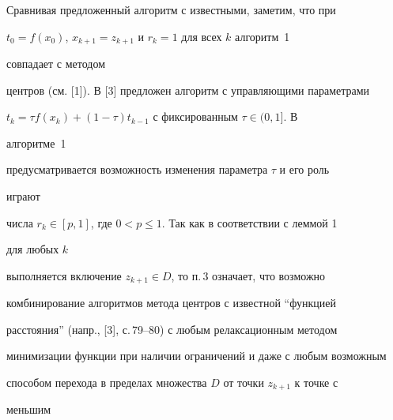 

 


Сравнивая предложенный алгоритм с известными, заметим, что при 


$t_0=f(x_0)$, $x_{k+1}=z_{k+1}$ и $r_k=1$ для всех $k$ алгоритм~1 


совпадает с методом 


центров (см. [1]). В [3] предложен алгоритм с управляющими параметрами 


$t_k=\tau f(x_k)+(1-\tau)t_{k-1}$ с фиксированным $\tau\in(0,1]$. В 


алгоритме~1 


предусматривается возможность изменения параметра $\tau$ и его роль 


играют 


числа $r_k\in[p,1]$, где $0<p\le 1$. Так как в соответствии с леммой 1 


для любых $k$ 


выполняется включение $z_{k+1}\in D$, то п.\,3 означает, что возможно 


комбинирование алгоритмов метода центров с известной ``функцией 


расстояния'' (напр., [3], с.\,79--80) с любым релаксационным методом 


минимизации функции при наличии ограничений и даже с любым возможным 


способом перехода в пределах множества $D$ от точки $z_{k+1}$ к точке с 


меньшим 


